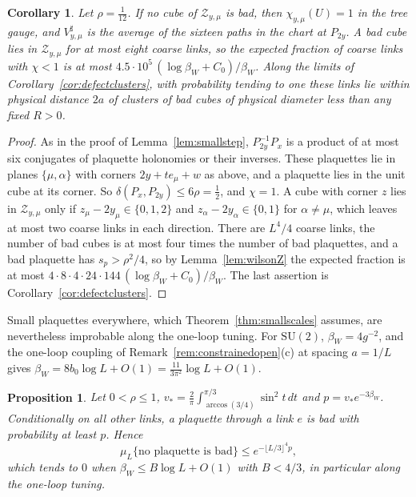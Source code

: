 \documentclass[11pt]{amsart}
\newtheorem{proposition}[theorem]{Proposition}
\newtheorem{corollary}[theorem]{Corollary}
\theoremstyle{definition}
\theoremstyle{remark}
\numberwithin{equation}{section}
\newcommand{\SU}{\mathrm{SU}}
\begin{document}
\begin{corollary}\label{cor:activelinks}
Let $\rho=\frac1{12}$. If no cube of $\mathcal Z_{y,\mu}$ is bad, then
$\chi_{y,\mu}(U)=1$ in the tree gauge, and $V^\sharp_{y,\mu}$ is the average
of the sixteen paths in the chart at $P_{2y}$. A bad cube lies in
$\mathcal Z_{y,\mu}$ for at most eight coarse links, so the expected
fraction of coarse links with $\chi<1$ is at most $4.5\cdot10^5\,(\log
\beta_W+C_0)/\beta_W$. Along the limits of Corollary~\ref{cor:defectclusters},
with probability tending to one these links lie within physical distance
$2a$ of clusters of bad cubes of physical diameter less than any fixed
$R>0$.
\end{corollary}

\begin{proof}
As in the proof of Lemma~\ref{lem:smallstep}, $P_{2y}^{-1}P_x$ is a
product of at most six conjugates of plaquette holonomies or their
inverses. These plaquettes lie in planes $\{\mu,\alpha\}$ with corners
$2y+te_\mu+w$ as above, and a plaquette lies in the unit cube at its
corner. So $\delta(P_x,P_{2y})\le6\rho=\frac12$, and $\chi=1$. A cube with
corner $z$ lies in $\mathcal Z_{y,\mu}$ only if $z_\mu-2y_\mu\in\{0,1,2\}$
and $z_\alpha-2y_\alpha\in\{0,1\}$ for $\alpha\ne\mu$, which leaves at
most two coarse links in each direction. There are $L^4/4$ coarse links,
the number of bad cubes is at most four times the number of bad
plaquettes, and a bad plaquette has $s_p>\rho^2/4$, so by
Lemma~\ref{lem:wilsonZ} the expected fraction is at most $4\cdot8\cdot4
\cdot24\cdot144\,(\log\beta_W+C_0)/\beta_W$. The last assertion is
Corollary~\ref{cor:defectclusters}.
\end{proof}

Small plaquettes everywhere, which Theorem~\ref{thm:smallscales} assumes,
are nevertheless improbable along the one-loop tuning. For $\SU(2)$,
$\beta_W=4g^{-2}$, and the one-loop coupling of
Remark~\ref{rem:constrainedopen}(c) at spacing $a=1/L$ gives $\beta_W=8b_0
\log L+O(1)=\frac{11}{3\pi^2}\log L+O(1)$.

\begin{proposition}\label{prop:manydefects}
Let $0<\rho\le1$, $v_*=\frac2\pi\int_{\arccos(3/4)}^{\pi/3}\sin^2t\,dt$ and
$p=v_*e^{-3\beta_W}$. Conditionally on all other links, a plaquette through
a link $e$ is bad with probability at least $p$. Hence
\[
\mu_L\{\text{no plaquette is bad}\}\le e^{-\lfloor L/3\rfloor^4p},
\]
which tends to $0$ when $\beta_W\le B\log L+O(1)$ with $B<4/3$, in
particular along the one-loop tuning.
\end{proposition}
\end{document}
